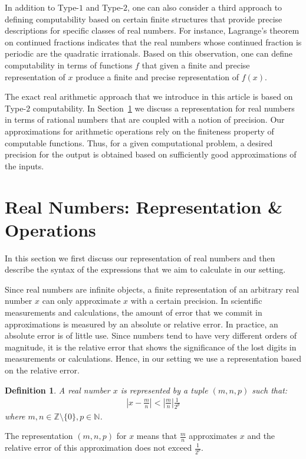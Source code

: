 \documentclass{article}
\newcommand{\nat}{\mathbb{N}}
\newcommand{\nonzerointeger}{\mathbb{Z}\setminus \{0\}}
\numberwithin{mytheorem}{section}
\newtheorem{definition}{Definition}
\begin{document}
In addition to Type-$1$ and Type-$2$, one can also consider a third approach to defining computability based on certain finite structures that provide precise descriptions for specific classes of real numbers. For instance, Lagrange's theorem on continued fractions indicates that the real numbers whose continued fraction is periodic are the quadratic irrationals. Based on this observation, one can define computability in terms of functions $f$ that given a finite and precise representation of $x$ produce a finite and precise representation of $f(x)$.   

The exact real arithmetic approach that we introduce in this article is based on Type-$2$ computability. In Section~\ref{sec:representation} we discuss a representation for real numbers in terms of rational numbers that are coupled with a notion of precision. Our approximations for arithmetic operations rely on the finiteness property of computable functions. Thus, for a given computational problem, a desired precision for the output is obtained based on sufficiently good approximations of the inputs. 

\section{Real Numbers: Representation \& Operations}
\label{sec:representation}
In this section we first discuss our representation of real numbers and then describe the syntax of the expressions that we aim to calculate in our setting. 

Since real numbers are infinite objects, a finite representation of an arbitrary real number $x$ can only approximate $x$ with a certain precision. In scientific measurements and calculations, the amount of error that we commit in approximations is measured by an absolute or relative error. In practice, an absolute error is of little use. Since numbers tend to have very different orders of magnitude, it is the relative error that shows the significance of the lost digits in measurements or calculations. Hence, in our setting we use a representation based on the relative error.
\begin{definition}\label{def:realrep}
A real number $x$ is represented by a tuple $(m,n,p)$ such that:
\begin{align*}
|x-\frac{m}{n}| < |\frac{m}{n}|\frac{1}{2^p}
\end{align*}
where $m,n\in \nonzerointeger, p\in \nat$.  
\end{definition}
The representation $(m,n,p)$ for $x$ means that $\frac{m}{n}$ approximates $x$ and the relative error of this approximation does not exceed $\frac{1}{2^p}$. 
\end{document}
